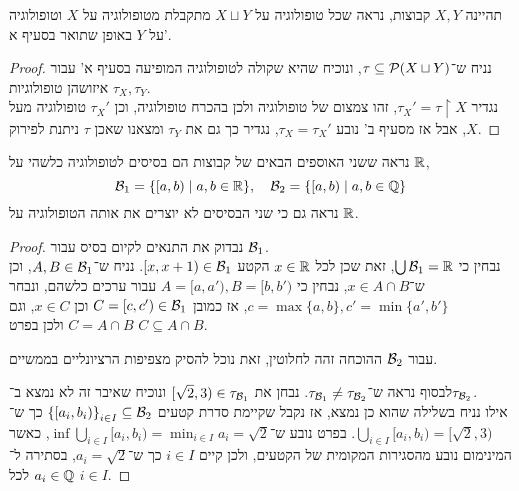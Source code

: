\subquestion{}
תהיינה $X, Y$ קבוצות, נראה שכל טופולוגיה על $X \sqcup Y$ מתקבלת מטופולוגיה על $X$ וטופולוגיה על $Y$ באופן שתואר בסעיף א'.
\begin{proof}
	נניח ש־$\tau \subseteq \mathcal{P}(X \sqcup Y)$, ונוכיח שהיא שקולה לטופולוגיה המופיעה בסעיף א' עבור איזושהן טופולוגיות $\tau_X, \tau_Y$. \\
	נגדיר $\tau_X' = \tau \restriction X$, זהו צמצום של טופולוגיה ולכן בהכרח טופולוגיה, וכן $\tau_X'$ טופולוגיה מעל $X$, אבל אז מסעיף ב' נובע $\tau_X = \tau_X'$, נגדיר כך גם את $\tau_Y$ ומצאנו שאכן $\tau$ ניתנת לפירוק.
\end{proof}

\question{}
נראה ששני האוספים הבאים של קבוצות הם בסיסים לטופולוגיה כלשהי על $\mathbb{R}$,
\[
	\mathcal{B}_1 = \{ [a, b) \mid a, b \in \mathbb{R} \},
	\quad
	\mathcal{B}_2 = \{ [a, b) \mid a, b \in \mathbb{Q} \}
\]
נראה גם כי שני הבסיסים לא יוצרים את אותה הטופולוגיה על $\mathbb{R}$.
\begin{proof}
	נבדוק את התנאים לקיום בסיס עבור $\mathcal{B}_1$. \\
	נבחין כי $\bigcup \mathcal{B}_1 = \mathbb{R}$, זאת שכן לכל $x \in \mathbb{R}$ הקטע $[x, x + 1) \in \mathcal{B}_1$.
	נניח ש־$A, B \in \mathcal{B}_1$, וכן ש־$x \in A \cap B$, נבחין כי $A = [a, a'), B = [b, b')$ עבור ערכים כלשהם, ונבחר $c = \max\{a, b\}, c' = \min\{a', b'\}$, אז כמובן $C = [c, c') \in \mathcal{B}_1$ וכן $x \in C$,
	וגם $C = A \cap B$ ולכן בפרט $C \subseteq A \cap B$.

	עבור $\mathcal{B}_2$ ההוכחה זהה לחלוטין, זאת נוכל להסיק מצפיפות הרציונליים בממשיים.

	לבסוף נראה ש־$\tau_{\mathcal{B}_1} \ne \tau_{\mathcal{B}_2}$.
	נבחן את $[\sqrt{2}, 3) \in \tau_{\mathcal{B}_1}$ ונוכיח שאיבר זה לא נמצא ב־$\tau_{\mathcal{B}_2}$. \\
	אילו נניח בשלילה שהוא כן נמצא, אז נקבל שקיימת סדרת קטעים ${\{[a_i, b_i)\}}_{i \in I} \subseteq \mathcal{B}_2$ כך ש־$\bigcup_{i \in I} [a_i, b_i) = [\sqrt{2}, 3)$.
	בפרט נובע ש־$\inf \bigcup_{i \in I} [a_i, b_i) = \min_{i \in I} a_i = \sqrt{2}$, כאשר המינימום נובע מהסגירות המקומית של הקטעים, ולכן קיים $i \in I$ כך ש־$a_i = \sqrt{2}$, בסתירה ל־$a_i \in \mathbb{Q}$ לכל $i \in I$.
\end{proof}


